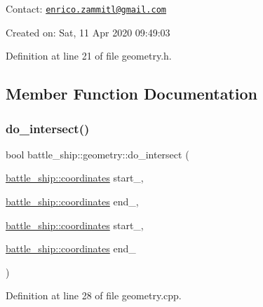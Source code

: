 Contact\+: \href{mailto:enrico.zammitl@gmail.com}{\tt enrico.\+zammitl@gmail.\+com}

Created on\+: Sat, 11 Apr 2020 09\+:49\+:03 

Definition at line 21 of file geometry.\+h.



\subsection{Member Function Documentation}
\mbox{\label{classbattle__ship_1_1geometry_a5415f69950638f0c84652b40d38e7ebd}} 
\subsubsection{\texorpdfstring{do\+\_\+intersect()}{do\_intersect()}}
{\footnotesize\ttfamily bool battle\+\_\+ship\+::geometry\+::do\+\_\+intersect (\begin{DoxyParamCaption}\item[{\hyperlink{structbattle__ship_1_1coordinates}{battle\+\_\+ship\+::coordinates}}]{start\+\_,  }\item[{\hyperlink{structbattle__ship_1_1coordinates}{battle\+\_\+ship\+::coordinates}}]{end\+\_,  }\item[{\hyperlink{structbattle__ship_1_1coordinates}{battle\+\_\+ship\+::coordinates}}]{start\+\_,  }\item[{\hyperlink{structbattle__ship_1_1coordinates}{battle\+\_\+ship\+::coordinates}}]{end\+\_ }\end{DoxyParamCaption})\hspace{0.3cm}{\ttfamily [static]}}



Definition at line 28 of file geometry.\+cpp.

\mbox{\label{classbattle__ship_1_1geometry_a69fccbb7267eb16930041fbdfeb1064a}} 
